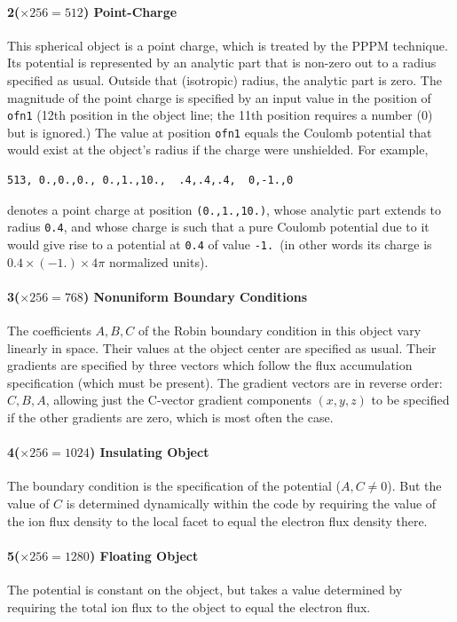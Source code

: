 \documentclass[12pt]{article}
\begin{document}
\paragraph{2($\times256=512$) Point-Charge} This spherical object is a
point charge, which is treated by the PPPM technique. Its potential is
represented by an analytic part that is non-zero out to a radius
specified as usual. Outside that (isotropic) radius, the analytic part
is zero. The magnitude of the point charge is specified by an input
value in the position of \verb!ofn1! (12th position in the object
line; the 11th position requires a number (0) but is ignored.) The
value at position \verb!ofn1! equals the Coulomb potential that would
exist at the object's radius if the charge were unshielded.
For example,
\begin{verbatim}
513, 0.,0.,0., 0.,1.,10.,  .4,.4,.4,  0,-1.,0
\end{verbatim}
denotes a point charge at position \verb!(0.,1.,10.)!, whose
analytic part extends to radius \verb!0.4!, and whose charge is such
that a pure Coulomb potential due to it would give rise to a potential
at \verb!0.4! of value \verb!-1.!\ (in other words its charge is
$0.4\times(-1.)\times4\pi$ normalized units). 

\paragraph{3($\times256=768$) Nonuniform Boundary Conditions} The
coefficients $A,B,C$ of the Robin boundary condition in this object vary
linearly in space. Their values at the object center are specified as
usual. Their gradients are specified by three vectors which follow the
flux accumulation specification (which must be present). The gradient
vectors are in reverse order: $C, B, A$, allowing just the C-vector
gradient components
$(x,y,z)$ to be specified if the other gradients are zero, which is
most often the case.

\paragraph{4($\times256=1024$) Insulating Object} The boundary
condition is the specification of the potential ($A,C\ne 0$). But the
value of $C$ is determined dynamically within the code by requiring
the value of the ion flux density to the local facet to equal the
electron flux density there.

\paragraph{5($\times256=1280$) Floating Object} The potential is constant
on the object, but takes a value determined by requiring the total ion
flux to the object to equal the electron flux.
\end{document}
